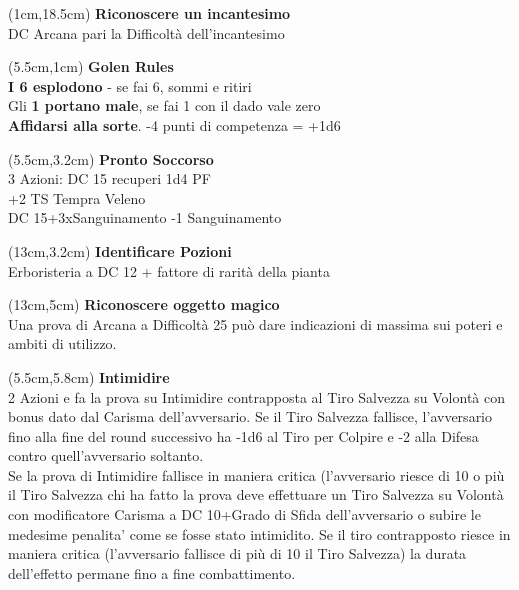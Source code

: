 \documentclass[a4paper,12 pt,openany]{book}
\begin{document}
	\begin{textblock*}{4cm}(1cm,18.5cm) %
\textbf{Riconoscere un incantesimo}\\ DC Arcana pari la Difficoltà dell'incantesimo

	\end{textblock*}	

	\begin{textblock*}{14.5cm}(5.5cm,1cm) %
	\textbf{Golen Rules}\\
	
	{\textbf{I 6 esplodono}} - se fai 6, sommi e ritiri\\
	Gli \textbf{1 portano male}, se fai 1 con il dado vale zero\\
	\textbf{Affidarsi alla sorte}. -4 punti di competenza = +1d6\\
\end{textblock*}	

	\begin{textblock*}{7cm}(5.5cm,3.2cm) %
	\textbf{Pronto Soccorso}\\
3 Azioni: DC 15 recuperi 1d4 PF\\
+2 TS Tempra Veleno\\
DC 15+3xSanguinamento -1 Sanguinamento
\end{textblock*}	

\begin{textblock*}{7cm}(13cm,3.2cm) %
\textbf{Identificare  Pozioni}\\
Erboristeria a DC 12 + fattore di rarità della pianta
\end{textblock*}	

\begin{textblock*}{7cm}(13cm,5cm) %
\textbf{Riconoscere oggetto magico}\\
Una prova di Arcana a Difficoltà 25 può dare indicazioni di massima sui poteri e ambiti di utilizzo.
\end{textblock*}	

	\begin{textblock*}{7cm}(5.5cm,5.8cm) %
\textbf{Intimidire}\\
2 Azioni e fa la prova su
Intimidire contrapposta al Tiro Salvezza su
Volontà con bonus dato dal Carisma
dell’avversario. Se il Tiro Salvezza fallisce,
l’avversario fino alla fine del round successivo ha
-1d6 al Tiro per Colpire e -2 alla Difesa contro
quell’avversario soltanto.\\
Se la prova di Intimidire fallisce in maniera
critica (l’avversario riesce di 10 o più il Tiro
Salvezza chi ha fatto la prova deve effettuare un
Tiro Salvezza su Volontà con modificatore
Carisma a DC 10+Grado di Sfida dell’avversario
o subire le medesime penalita’ come se fosse
stato intimidito. Se il tiro contrapposto riesce in
maniera critica (l’avversario fallisce di più di 10 il
Tiro Salvezza) la durata dell’effetto permane fino
a fine combattimento.
\end{textblock*}	
\end{document}

